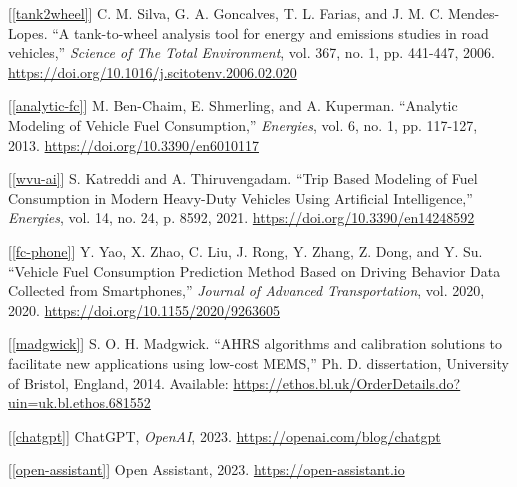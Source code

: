 \documentclass[11pt, oneside]{article}
\newcommand{\refinit}[1]{\noindent \hangindent=0.6cm [\ref*{#1}]}  %
\begin{document}
\begin{footnotesize}
\refinit{tank2wheel} C. M. Silva, G. A. Goncalves, T. L. Farias, and J. M. C. Mendes-Lopes. ``A tank-to-wheel analysis tool for energy and emissions studies in road vehicles,'' \textit{Science of The Total Environment}, vol. 367, no. 1, pp. 441-447, 2006. \url{https://doi.org/10.1016/j.scitotenv.2006.02.020}

\refinit{analytic-fc} M. Ben-Chaim, E. Shmerling, and A. Kuperman. ``Analytic Modeling of Vehicle Fuel Consumption,'' \textit{Energies}, vol. 6, no. 1, pp. 117-127, 2013. \url{https://doi.org/10.3390/en6010117}

\refinit{wvu-ai} S. Katreddi and A. Thiruvengadam. ``Trip Based Modeling of Fuel Consumption in Modern Heavy-Duty Vehicles Using Artificial Intelligence,'' \textit{Energies}, vol. 14, no. 24, p. 8592, 2021. \url{https://doi.org/10.3390/en14248592}

\refinit{fc-phone} Y. Yao, X. Zhao, C. Liu, J. Rong, Y. Zhang, Z. Dong, and Y. Su. ``Vehicle Fuel Consumption Prediction Method Based on Driving Behavior Data Collected from Smartphones,'' \textit{Journal of Advanced Transportation}, vol. 2020, 2020. \url{https://doi.org/10.1155/2020/9263605}

\refinit{madgwick} S. O. H. Madgwick. ``AHRS algorithms and calibration solutions to facilitate new applications using low-cost MEMS,'' Ph. D. dissertation, University of Bristol, England, 2014. Available: \url{https://ethos.bl.uk/OrderDetails.do?uin=uk.bl.ethos.681552}

\refinit{chatgpt} ChatGPT, \textit{OpenAI}, 2023. \url{https://openai.com/blog/chatgpt}

\refinit{open-assistant} Open Assistant, 2023. \url{https://open-assistant.io}

\end{footnotesize}
\end{document}
